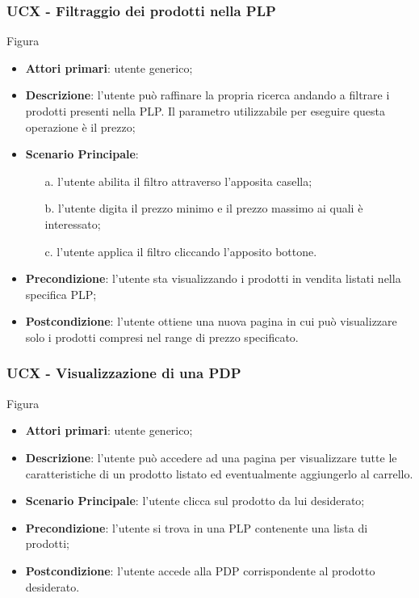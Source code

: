 \subsubsection{UCX - Filtraggio dei prodotti nella PLP}
Figura \\
\begin{itemize}
\item \textbf{Attori primari}: utente generico;
\item \textbf{Descrizione}: l'utente può raffinare la propria ricerca andando a filtrare i prodotti presenti nella PLP. Il parametro utilizzabile per eseguire questa operazione è il prezzo;
\item \textbf{Scenario Principale}:
\begin{enumerate}
\item[a.] l'utente abilita il filtro attraverso l'apposita casella;
\item[b.] l'utente digita il prezzo minimo e il prezzo massimo ai quali è interessato;
\item[c.] l'utente applica il filtro cliccando l'apposito bottone.
\end{enumerate}
\item \textbf{Precondizione}: l'utente sta visualizzando i prodotti in vendita listati nella specifica PLP;
\item \textbf{Postcondizione}: l'utente ottiene una nuova pagina in cui può visualizzare solo i prodotti compresi nel range di prezzo specificato.
\end{itemize}
\subsubsection{UCX - Visualizzazione di una PDP}
Figura \\
\begin{itemize}
\item \textbf{Attori primari}: utente generico;
\item \textbf{Descrizione}: l'utente può accedere ad una pagina per visualizzare tutte le caratteristiche di un prodotto listato ed eventualmente aggiungerlo al carrello.
\item \textbf{Scenario Principale}: l'utente clicca sul prodotto da lui desiderato;
\item \textbf{Precondizione}: l'utente si trova in una PLP contenente una lista di prodotti;
\item \textbf{Postcondizione}: l'utente accede alla PDP corrispondente al prodotto desiderato.
\end{itemize}
